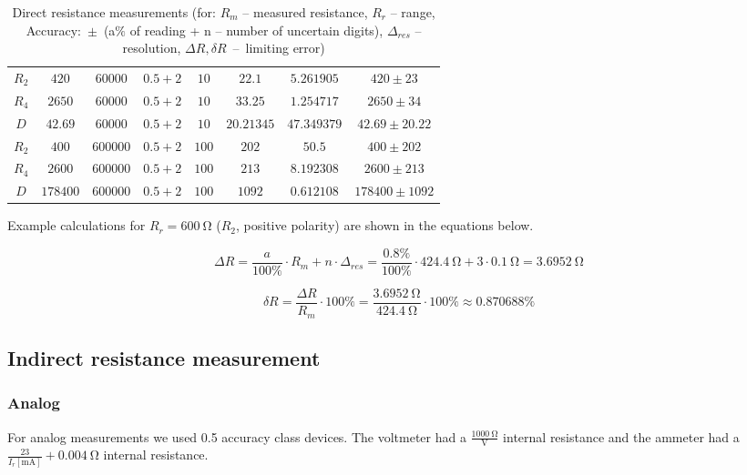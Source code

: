 \begin{table}[H]
\begin{tabular}{|  c | c | c | c | c | c | c | c |}
		\hline
		$R_2$ & $420$ & $60000$ & $0.5+2$ & $10$ & $22.1$ & $5.261905$ & $420 \pm 23$ \\
		$R_4$ & $2650$ & $60000$ & $0.5+2$ & $10$ & $33.25$ & $1.254717$ & $2650 \pm 34$ \\
		$D$ & $42.69$ & $60000$ & $0.5+2$ & $10$ & $20.21345$ & $47.349379$ & $42.69 \pm 20.22$ \\
		\hline
		$R_2$ & $400$ & $600000$ & $0.5+2$ & $100$ & $202$ & $50.5$ & $400 \pm 202$ \\
		$R_4$ & $2600$ & $600000$ & $0.5+2$ & $100$ & $213$ & $8.192308$ & $2600 \pm 213$ \\
		$D$ & $178400$ & $600000$ & $0.5+2$ & $100$ & $1092$ & $0.612108$ & $178400 \pm 1092$ \\
		\hline
	\end{tabular}
	\caption{Direct resistance measurements (for: $R_m$ -- measured resistance, $R_r$ -- range, Accuracy:~$\pm$~(a$\unit{\percent}$ of reading + n  -- number of uncertain digits), $\Delta_{res}$ -- resolution, $\Delta R, \delta R$~--~limiting error)}
	\label{tab:direct}
\end{table}

Example calculations for $R_r = \SI{600}{\ohm}$ ($R_2$, positive polarity) are shown in the equations below.

\begin{equation}
	\Delta R = \frac{a}{100\unit{\percent}}\cdot R_m + n\cdot \Delta_{res} = \frac{0.8\unit{\percent}}{100\unit{\percent}}\cdot\SI{424.4}{\ohm} + 3\cdot\SI{0.1}{\ohm} = \SI{3.6952}{\ohm}
\end{equation}

\begin{equation}
	\delta R = \frac{\Delta R}{R_m}\cdot 100\unit{\percent} = \frac{\SI{3.6952}{\ohm}}{\SI{424.4}{\ohm}}\cdot 100\unit{\percent}\approx 0.870688\unit{\percent}
\end{equation}

\subsection{Indirect resistance measurement}


\subsubsection{Analog}

For analog measurements we used 0.5 accuracy class devices. The voltmeter had a $\frac{\SI{1000}{\ohm}}{\unit{\volt}}$ internal resistance and the ammeter had a $\frac{23}{I_r[\unit{\milli\ampere}]} + \SI{0.004}{\ohm}$ internal resistance.


